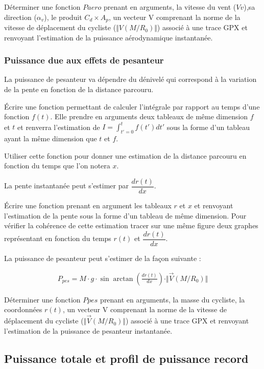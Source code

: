 \question{} Déterminer une fonction $Paero$ prenant en arguments, la vitesse du vent ($Vv$),sa direction ($\alpha_v$), le produit $C_d\times A_p$, un vecteur V comprenant la norme de la vitesse de déplacement du cycliste ($\Vert V(M/R_0)\Vert$) associé à une trace GPX et renvoyant l'estimation de la puissance aérodynamique instantanée.  

\subsubsection{Puissance due aux effets de pesanteur}

La puissance de pesanteur va dépendre du dénivelé qui correspond à la variation de la pente en fonction de la distance parcouru.

\question{} Écrire une fonction permettant de calculer l'intégrale par rapport au temps d'une fonction $f(t)$. Elle prendre en arguments deux tableaux de même dimension $f$ et $t$ et renverra l'estimation de $I=\displaystyle{\int_{t'=0}^t}f(t')dt'$ sous la forme d'un tableau ayant la même dimension que $t$ et $f$.

\question{} Utiliser cette fonction pour donner une estimation de la distance parcouru en fonction du temps que l'on notera $x$.

La pente instantanée peut s'estimer par $\dfrac{dr(t)}{dx}$.

\question{} Écrire une fonction prenant en argument les tableaux $r$ et $x$ et renvoyant l'estimation de la pente sous la forme d'un tableau de même dimension. Pour vérifier la cohérence de cette estimation tracer sur une même figure deux graphes représentant en fonction du temps $r(t)$ et $\dfrac{dr(t)}{dx}$.

La puissance de pesanteur peut s'estimer de la façon suivante : 

\begin{align*}
P_{pes}=M\cdot g \cdot \sin\arctan\left(\frac{dr(t)}{dx}\right)\cdot \Vert \overrightarrow{V}(M/R_0)\Vert 
\end{align*}

\question{} Déterminer une fonction $Ppes$ prenant en arguments, la masse du cycliste, la coordonnées $r(t)$, un vecteur V comprenant la norme de la vitesse de déplacement du cycliste ($\Vert \overrightarrow{V}(M/R_0)\Vert$) associé à une trace GPX et renvoyant l'estimation de la puissance de pesanteur instantanée.  

\subsection{Puissance totale et profil de puissance record}

